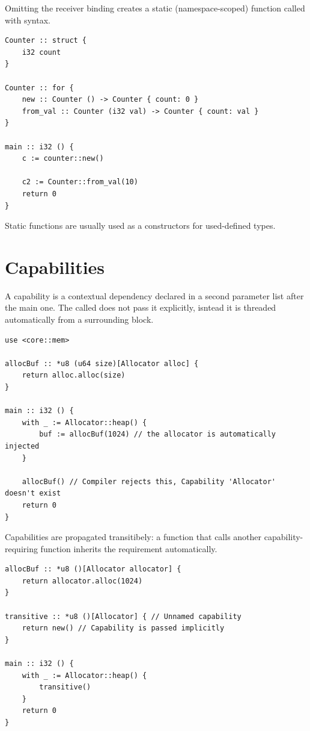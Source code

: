 Omitting the receiver binding creates a static (namespace-scoped) function called with  syntax.

\begin{lstlisting}[style=zinc, caption={Static functions}]
Counter :: struct {
    i32 count
}

Counter :: for {
    new :: Counter () -> Counter { count: 0 }
    from_val :: Counter (i32 val) -> Counter { count: val }
}

main :: i32 () {
    c := counter::new()

    c2 := Counter::from_val(10)
    return 0
}
\end{lstlisting}

Static functions are usually used as a constructors for used-defined types.

\section{Capabilities}
\label{sec:capabilities}

A capability is a contextual dependency declared in a second parameter list after the main one.
The called does not pass it explicitly, isntead it is threaded automatically from a surrounding  block.

\begin{lstlisting}[style=zinc, caption={Capability declaration and use}]
use <core::mem>

allocBuf :: *u8 (u64 size)[Allocator alloc] {
    return alloc.alloc(size)
}

main :: i32 () {
    with _ := Allocator::heap() {
        buf := allocBuf(1024) // the allocator is automatically injected
    }

    allocBuf() // Compiler rejects this, Capability 'Allocator' doesn't exist
    return 0
}
\end{lstlisting}

Capabilities are propagated transitibely: a function that calls another capability-requiring function inherits the requirement automatically.

\begin{lstlisting}[style=zinc, caption={Transitive capability}]
allocBuf :: *u8 ()[Allocator allocator] {
    return allocator.alloc(1024)
}

transitive :: *u8 ()[Allocator] { // Unnamed capability
    return new() // Capability is passed implicitly
}

main :: i32 () {
    with _ := Allocator::heap() {
        transitive()
    }
    return 0
}
\end{lstlisting}

